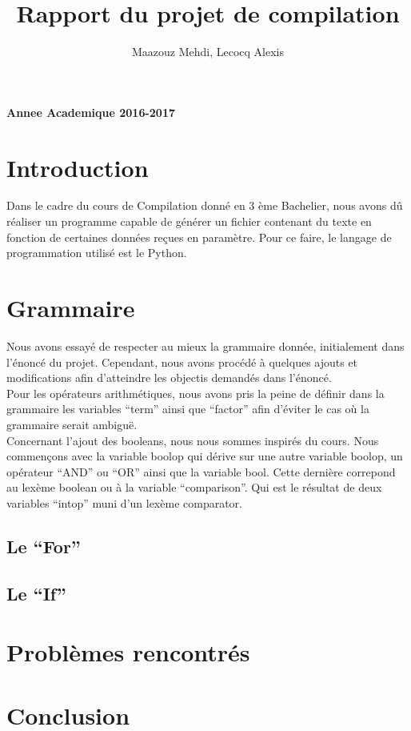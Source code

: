 \documentclass[a4paper,10pt]{article}
\title{Rapport du projet de compilation}
\author{Maazouz Mehdi, Lecocq Alexis}
\begin{document}
\maketitle
\textbf{Annee Academique 2016-2017}\\
\tableofcontents
\newpage

\section{Introduction}
Dans le cadre du cours de Compilation donné en 3 ème Bachelier, nous avons dû réaliser un programme
capable de générer un fichier contenant du texte en fonction de certaines données reçues en paramètre.
Pour ce faire, le langage de programmation utilisé est le Python.
\section{Grammaire}
Nous avons essayé de respecter au mieux la grammaire donnée, initialement dans l'énoncé du projet.
Cependant, nous avons procédé à quelques ajouts et modifications afin d'atteindre les objectis demandés dans 
l'énoncé.\\
Pour les opérateurs arithmétiques, nous avons pris la peine de définir dans la grammaire les variables ``term'' ainsi que ``factor'' afin d'éviter
le cas où la grammaire serait ambiguë.\\
Concernant l'ajout des booleans, nous nous sommes inspirés du cours. Nous commençons avec la variable boolop qui dérive sur une autre variable
boolop, un opérateur ``AND'' ou ``OR'' ainsi que la variable bool. Cette dernière correpond au lexème boolean ou à la variable ``comparison''.
Qui est le résultat de deux variables ``intop'' muni d'un lexème comparator.
\subsection{Le ``For''}
\subsection{Le ``If''}
\section{Problèmes rencontrés}
\section{Conclusion}
\end{document}
